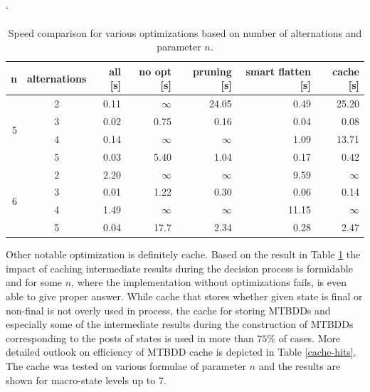 \begin{table}[h!]
\catcode`
 \begin{center}
  \begin{tabular}{| r | c || r | r | r | r | r |}
  \hline
   \textbf{n} & \textbf{alternations} & \textbf{all [s]} & \textbf{no opt
   [s]} & \textbf{pruning [s]} & \textbf{smart flatten [s]} & \textbf{cache
   [s]}\\
   \hline
   \hline
    \multirow{4}{*}{5} & 2 & 0.11 & $\infty$ & 24.05 & 0.49 & 25.20\\
    \cline{2-7}
     & 3 & 0.02 & 0.75 & 0.16 & 0.04 & 0.08\\
    \cline{2-7}
     & 4 & 0.14 & $\infty$ & $\infty$ & 1.09 & 13.71\\
    \cline{2-7}
     & 5 & 0.03 & 5.40 & 1.04 & 0.17 & 0.42\\
    \hline
   \hline
   \multirow{4}{*}{6} & 2 & 2.20 & $\infty$ & $\infty$ & 9.59 & $\infty$\\
   \cline{2-7}
    & 3 & 0.01 & 1.22 & 0.30 & 0.06 & 0.14\\
    \cline{2-7}
    & 4 & 1.49 & $\infty$ & $\infty$ & 11.15 & $\infty$\\
    \cline{2-7}
    & 5 & 0.04 & 17.7 & 2.34 & 0.28 & 2.47\\
   \hline
  \end{tabular}
 \end{center}
 \caption{Speed comparison for various optimizations based on number of
 alternations and parameter $n$.}\label{opt-times}
\end{table}
\newpage
Other notable optimization is definitely cache. Based on the result in
Table \ref{opt-times} the impact of caching intermediate results during the
decision process is formidable and for some $n$, where the implementation
without optimizations fails, is even able to give proper answer. While cache
that stores whether given state is final or non-final is not overly used in
process, the cache for storing MTBDDs and especially some of the intermediate
results during the construction of MTBDDs corresponding to the posts of states
is used in more than $75\%$ of cases. More detailed outlook on efficiency of
MTBDD cache is depicted in Table \ref{cache-hits}. The cache was tested on
various formulae of parameter $n$ and the results are shown for
macro-state levels up to $7$.

